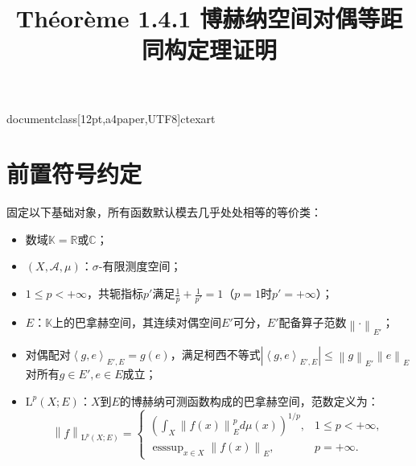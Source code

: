 documentclass[12pt,a4paper,UTF8]{ctexart}
\usepackage{amsmath,amsthm,amssymb,mathtools,enumitem}
\usepackage{mathrsfs} %

\newtheorem{theorem}{定理}[section]
\newtheorem{remark}{备注}

\newcommand{\norm}[1]{\left\| #1 \right\|} %
\newcommand{\inner}[2]{\left\langle #1, #2 \right\rangle} %
\newcommand{\Lp}[3][X]{\mathrm{L}^{#2}(#1;#3)} %
\newcommand{\dualp}[2]{\inner{#1}{#2}_{E',E}} %
\newcommand{\R}{\mathbb{R}}
\newcommand{\C}{\mathbb{C}}
\newcommand{\K}{\mathbb{K}} %



\title{Théorème 1.4.1 博赫纳空间对偶等距同构定理证明}
\author{}
\date{}
\maketitle

\section{前置符号约定}
固定以下基础对象，所有函数默认模去几乎处处相等的等价类：
\begin{itemize}[itemsep=0pt]
    \item 数域$\K = \R$或$\C$；
    \item $(X, \mathcal{A}, \mu)$：$\sigma$-有限测度空间；
    \item $1 \leq p < +\infty$，共轭指标$p'$满足$\frac{1}{p} + \frac{1}{p'} = 1$（$p=1$时$p'=+\infty$）；
    \item $E$：$\K$上的巴拿赫空间，其连续对偶空间$E'$可分，$E'$配备算子范数$\norm{\cdot}_{E'}$；
    \item 对偶配对$\dualp{g}{e} = g(e)$，满足柯西不等式$\left|\dualp{g}{e}\right| \leq \norm{g}_{E'}\norm{e}_E$对所有$g\in E', e\in E$成立；
    \item $\Lp{p}{E}$：$X$到$E$的博赫纳可测函数构成的巴拿赫空间，范数定义为：
    $$
    \norm{f}_{\Lp{p}{E}} = \begin{cases}
        \displaystyle\left( \int_X \norm{f(x)}_E^p d\mu(x) \right)^{1/p}, & 1\leq p<+\infty, \\
        \displaystyle\operatorname{esssup}_{x\in X} \norm{f(x)}_E, & p=+\infty.
    \end{cases}
    $$
\end{itemize}

